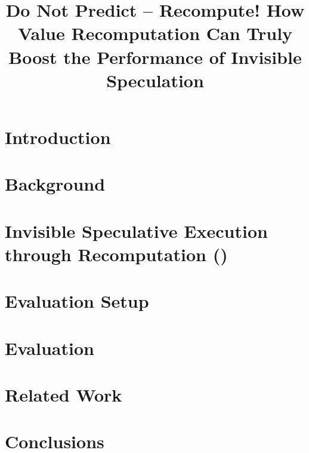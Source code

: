 \documentclass[conference]{IEEEtran}
\title{\LARGE \bf Do Not Predict -- Recompute! How Value Recomputation Can Truly Boost the Performance of Invisible Speculation
\vspace{-1.5em}
}
\begin{document}
\maketitle
\thispagestyle{firstpage}
\pagestyle{plain}


\begin{abstract}

\end{abstract}

\section{Introduction}
\label{sec:intro}


\section{Background}
\label{sec:back}


\section{Invisible Speculative Execution through Recomputation (\arch)}
\label{sec:arch}


%

\section{Evaluation Setup}
\label{sec:setup}


\section{Evaluation}
\label{sec:eval}


\section{Related Work}
\label{sec:rel}


\section{Conclusions}
\label{sec:conc}


%




\end{document}
